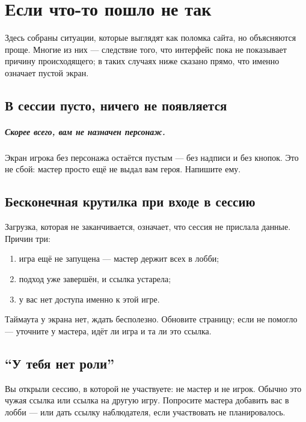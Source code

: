 \chapter{Если что-то пошло не так}
\label{ch:troubleshooting}

Здесь собраны ситуации, которые выглядят как поломка сайта, но объясняются проще. Многие из них --- следствие того, что интерфейс пока не показывает причину происходящего; в таких случаях ниже сказано прямо, что именно означает пустой экран.

\section{В сессии пусто, ничего не появляется}
\label{sec:trouble:empty-session}

\paragraph{Скорее всего, вам не назначен персонаж.}
Экран игрока без персонажа остаётся пустым --- без надписи и без кнопок. Это не сбой: мастер просто ещё не выдал вам героя. Напишите ему.

\section{Бесконечная крутилка при входе в сессию}
\label{sec:trouble:spinner}

Загрузка, которая не заканчивается, означает, что сессия не прислала данные. Причин три:

\begin{enumerate}
\item игра ещё не запущена --- мастер держит всех в лобби;
\item подход уже завершён, и ссылка устарела;
\item у вас нет доступа именно к этой игре.
\end{enumerate}

Таймаута у экрана нет, ждать бесполезно. Обновите страницу; если не помогло --- уточните у мастера, идёт ли игра и та ли это ссылка.

\section{``У тебя нет роли''}
\label{sec:trouble:no-role}

Вы открыли сессию, в которой не участвуете: не мастер и не игрок. Обычно это чужая ссылка или ссылка на другую игру. Попросите мастера добавить вас в лобби --- или дать ссылку наблюдателя, если участвовать не планировалось.

